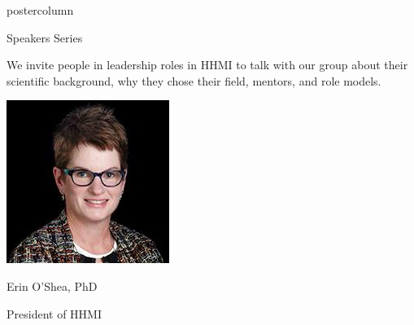 \documentclass{beamer}
\begin{document}
\begin{frame}
\begin{columns}
\begin{column}{.33\textwidth}
\begin{beamercolorbox}[center,wd=\textwidth]{postercolumn}
\begin{minipage}[T]{.95\textwidth}
{					\begin{myblock}{Speakers Series}
            \begin{addmargin}[1em]{1em}
                We invite people in leadership roles in HHMI to talk with our group about their scientific background, why they chose their field, mentors, and role models.
                \vspace{1cm}
            \end{addmargin}
            \begin{addmargin}[1em]{1em}
                \centering
                \begin{minipage}{0.4\linewidth}
                    \includegraphics[width=\linewidth]{img/erin.jpg}
                    \centerline{Erin O'Shea, PhD}\newline
                    \centerline{President of HHMI}
                \end{minipage}
                \hspace{0.75cm}
                \begin{minipage}{0.4\linewidth}

\end{minipage}
\end{addmargin}
\end{myblock}}
\end{minipage}
\end{beamercolorbox}
\end{column}
\end{columns}
\end{frame}
\end{document}
